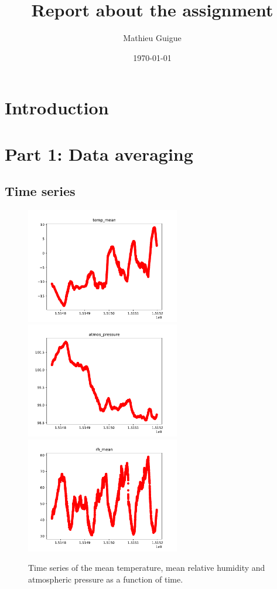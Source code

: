 \documentclass[11pt]{amsart}
\title{Report about the assignment}
\author{Mathieu Guigue}
\date{\today}                                           %
\begin{document}
\maketitle
\section{Introduction}

\section{Part 1: Data averaging}
\subsection{Time series}

\begin{figure}
    \includegraphics[width=0.6\textwidth]{../plots/temp_mean.pdf}
    \includegraphics[width=0.6\textwidth]{../plots/atmos_pressure.pdf}
    \includegraphics[width=0.6\textwidth]{../plots/rh_mean.pdf}
    \caption{Time series of the mean temperature, mean relative humidity and atmospheric pressure as a function of time.}
\end{figure}
\end{document}
